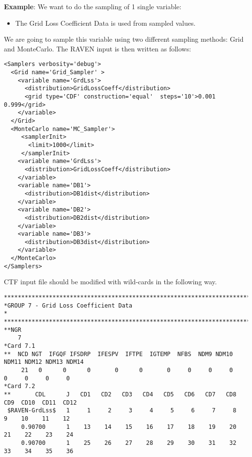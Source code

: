 \textbf{Example}:
We want to do the sampling of 1 single variable:
\begin{itemize}
  \item The Grid Loss Coefficient Data is used from sampled values.
\end{itemize}

\noindent We are going to sample this variable using two different sampling methods: Grid and MonteCarlo.
The RAVEN input is then written as follows:

\begin{lstlisting}[style=XML,morekeywords={name,type,construction,lowerBound,steps,limit,initialSeed}]
<Samplers verbosity='debug'>
  <Grid name='Grid_Sampler' >
    <variable name='GrdLss'>
      <distribution>GridLossCoeff</distribution>
      <grid type='CDF' construction='equal'  steps='10'>0.001 0.999</grid>
    </variable>
  </Grid>
  <MonteCarlo name='MC_Sampler'>
     <samplerInit>
       <limit>1000</limit>
     </samplerInit>
    <variable name='GrdLss'>
      <distribution>GridLossCoeff</distribution>
    </variable>
    <variable name='DB1'>
      <distribution>DB1dist</distribution>
    </variable>
    <variable name='DB2'>
      <distribution>DB2dist</distribution>
    </variable>
    <variable name='DB3'>
      <distribution>DB3dist</distribution>
    </variable>
  </MonteCarlo>
</Samplers>
\end{lstlisting}

CTF input file should be modified with wild-cards in the following way.
\begin{lstlisting}[basicstyle=\tiny]
***********************************************************************************************
*GROUP 7 - Grid Loss Coefficient Data                                                         *
***********************************************************************************************
**NGR
    7
*Card 7.1
**  NCD NGT  IFGQF IFSDRP  IFESPV  IFTPE  IGTEMP  NFBS  NDM9 NDM10 NDM11 NDM12 NDM13 NDM14
     21   0      0      0       0      0       0     0     0     0     0     0     0     0
*Card 7.2
**       CDL      J   CD1   CD2   CD3   CD4   CD5   CD6   CD7   CD8   CD9  CD10  CD11  CD12
 $RAVEN-GrdLss$   1     1     2     3     4     5     6     7     8     9    10    11    12
     0.90700      1    13    14    15    16    17    18    19    20    21    22    23    24
     0.90700      1    25    26    27    28    29    30    31    32    33    34    35    36

\end{lstlisting}

